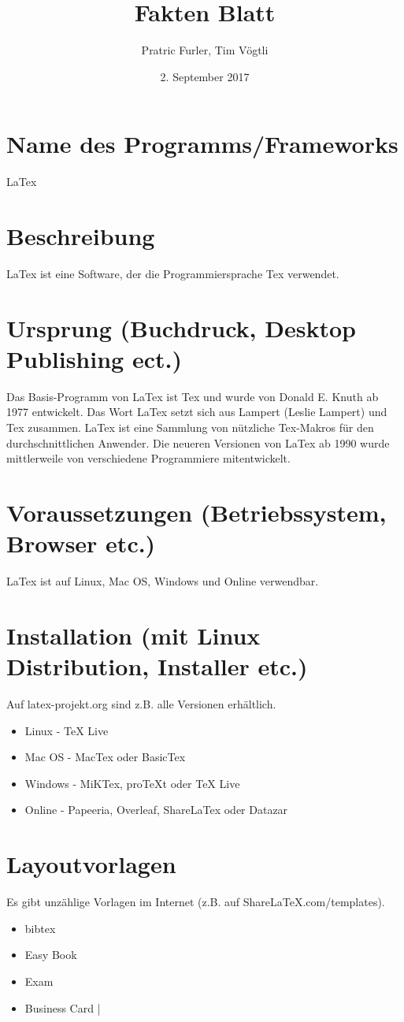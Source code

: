 \documentclass{scrartcl}
\title{Fakten Blatt}
\author{Pratric Furler, Tim Vögtli}
\date{2. September 2017}
\begin{document}
\maketitle

\section{Name des Programms/Frameworks}
LaTex

\section{Beschreibung}
LaTex ist eine Software, der die Programmiersprache Tex verwendet.

\section{Ursprung (Buchdruck, Desktop Publishing ect.)}

Das Basis-Programm von LaTex ist Tex und wurde von Donald E. Knuth ab 1977 entwickelt.
Das Wort LaTex setzt sich aus Lampert (Leslie Lampert) und Tex zusammen.
LaTex ist eine Sammlung von nützliche Tex-Makros für den durchschnittlichen Anwender.
Die neueren Versionen von LaTex ab 1990 wurde mittlerweile von verschiedene Programmiere mitentwickelt.

\section{Voraussetzungen (Betriebssystem, Browser etc.)}

LaTex ist auf Linux, Mac OS, Windows und Online verwendbar.

\section{Installation (mit Linux Distribution, Installer etc.)}

Auf latex-projekt.org sind z.B. alle Versionen erhältlich.
\begin{itemize}
	\item Linux - TeX Live
	\item Mac OS - MacTex oder BasicTex
	\item Windows - MiKTex, proTeXt oder TeX Live
	\item Online - Papeeria, Overleaf, ShareLaTex oder Datazar
\end{itemize}

\section{Layoutvorlagen}
Es gibt unzählige Vorlagen im Internet (z.B. auf ShareLaTeX.com/templates).
\begin{itemize}
	\item bibtex
	\item Easy Book
	\item Exam
	\item Business Card
|\end{itemize}
\end{document}
